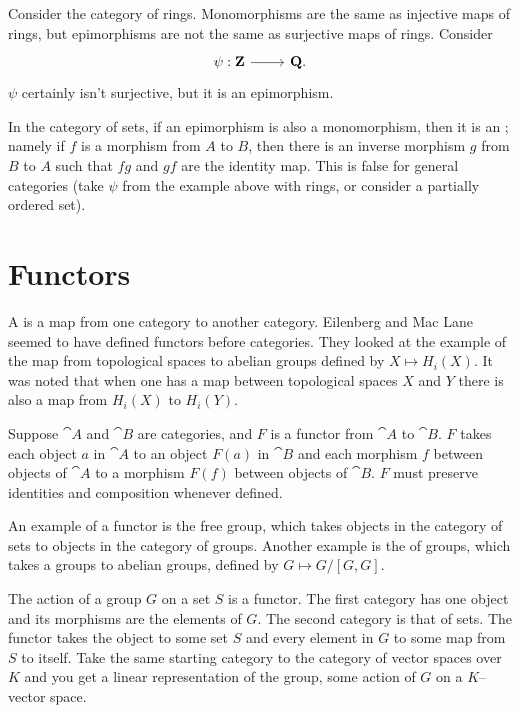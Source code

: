 \documentclass[11pt, twoside]{article}
\begin{document}
Consider the category of rings. Monomorphisms are the same as injective maps of rings, but epimorphisms are not the same as surjective maps of rings. Consider 
\[
\begin{tikzcd}
\psi:\Z \ar[r]& \Q.
\end{tikzcd}
\]
$\psi$ certainly isn't surjective, but it is an epimorphism.

In the category of sets, if an epimorphism is also a monomorphism, then it is an ; namely if $f$ is a morphism from $A$ to $B$, then there is an inverse morphism $g$ from $B$ to $A$ such that $fg$ and $gf$ are the identity map. This is false for general categories (take $\psi$ from the example above with rings, or consider a partially ordered set).


\section{Functors}
A \href{https://en.wikipedia.org/wiki/Functor}{} is a map from one category to another category. Eilenberg and Mac Lane seemed to have defined functors before categories. They looked at the example of the map from topological spaces to abelian groups defined by $X\longmapsto H_i(X)$. It was noted that when one has a map between topological spaces $X$ and $Y$ there is also a map from $H_i(X)$ to $H_i(Y)$.

Suppose $\cat A$ and $\cat B$ are categories, and $F$ is a functor from $\cat A$ to $\cat B$. $F$ takes each object $a$ in $\cat A$ to an object $F(a)$ in $\cat B$ and each morphism $f$ between objects of $\cat A$ to a morphism $F(f)$ between objects of $\cat B$. $F$ must preserve identities and composition whenever defined.

An example of a functor is the free group, which takes objects in the category of sets to objects in the category of groups. Another example is the \href{https://en.wikipedia.org/wiki/Commutator_subgroup#Abelianization}{} of groups, which takes a groups to abelian groups, defined by $G\longmapsto G/ [G,G]$.

The action of a group $G$ on a set $S$ is a functor. The first category has one object and its morphisms are the elements of $G$. The second category is that of sets. The functor takes the object to some set $S$ and every element in $G$ to some map from $S$ to itself. Take the same starting category to the category of vector spaces over $K$ and you get a linear representation of the group, some action of $G$ on a $K$--vector space. 
\end{document}
